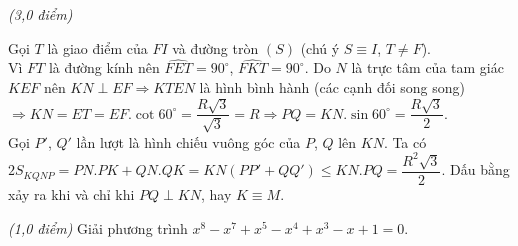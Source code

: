 \begin{ex}{\it{(3,0 điểm)}}
{\begin{enumerate}
\begin{center}
\end{center}
Gọi $T$ là giao điểm của $FI$ và đường tròn $(S)$ (chú ý $S\equiv I$, $T\neq F$).\\
Vì $FT$ là đường kính nên $\widehat{FET}=90^{\circ}$, $\widehat{FKT}=90^{\circ}$. Do $N$ là trực tâm của tam giác $KEF$ nên $KN\perp EF\Rightarrow KTEN$ là hình bình hành (các cạnh đối song song)\\
$\Rightarrow KN=ET=EF.\cot 60^{\circ}=\dfrac{R\sqrt{3}}{\sqrt{3}}=R\Rightarrow PQ=KN.\sin 60^{\circ}=\dfrac{R\sqrt{3}}{2}$.\\
Gọi $P'$, $Q'$ lần lượt là hình chiếu vuông góc của $P$, $Q$ lên $KN$. Ta có\\
$2S_{KQNP}=PN.PK+QN.QK=KN(PP'+QQ')\leq KN.PQ=\dfrac{R^{2}\sqrt{3}}{2}$. Dấu bằng xảy ra khi và chỉ khi $PQ\perp KN$, hay $K\equiv M$.
\end{enumerate}
}
\end{ex}
\begin{ex}{\it{(1,0 điểm)}}%
Giải phương trình $x^8 - x^7 + x^5 - x^4 + x^3 - x + 1 = 0$. 
\end{ex}
